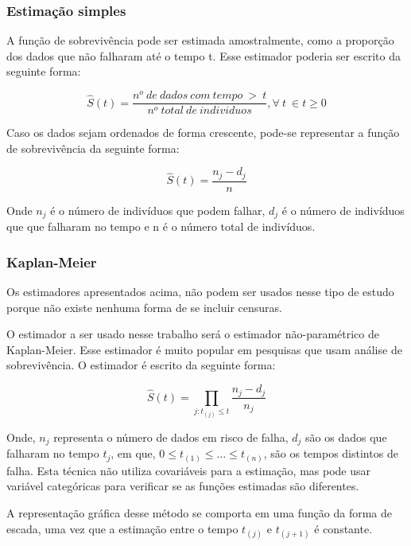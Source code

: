\documentclass[12pt,a4paper]{article}
\begin{document}
\subsubsection{Estimação simples}

A função de sobrevivência pode ser estimada amostralmente, como a proporção dos dados que não falharam até o tempo t. Esse estimador poderia ser escrito da seguinte forma:

$$ \hat{S}(t) = \dfrac{n^o \ de \ dados \ com \ tempo \ > \ t}{n^o \ total \ de \ individuos}, \forall \ t \ \in t\ge 0$$

Caso os dados sejam ordenados de forma crescente, pode-se representar a função de sobrevivência da seguinte forma:

$$ \hat{S}(t) = \dfrac{n_j - d_j}{n} $$

Onde $n_j$ é o número de indivíduos que podem falhar, $d_j$ é o número de indivíduos que que falharam no tempo e n é o número total de indivíduos.

\subsubsection{Kaplan-Meier}

Os estimadores apresentados acima, não podem ser usados nesse tipo de estudo porque não existe nenhuma forma de se incluir censuras.

O estimador a ser usado nesse trabalho será o estimador não-paramétrico de Kaplan-Meier. Esse estimador é muito popular em pesquisas que usam análise de sobrevivência. O estimador é escrito da seguinte forma:

$$ \hat{S}(t) = \prod_{j:t_{(j)}\le t} \dfrac{n_j - d_j}{n_j}$$

Onde, $n_j$ representa o número de dados em risco de falha, $d_j$ são os dados que falharam no tempo $t_j$, em que, $0 \le t_{(1)} \le \hdots \le t_{(n)}$, são os tempos distintos de falha. Esta técnica não utiliza covariáveis para a estimação, mas pode usar variável categóricas para verificar se as funções estimadas são diferentes. 

A representação gráfica desse método se comporta em uma função da forma de escada, uma vez que a estimação entre o tempo $t_{(j)}$ e $t_{(j+1)}$ é constante.
\end{document}
